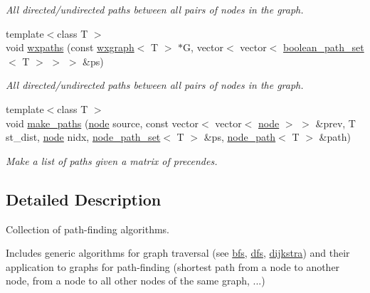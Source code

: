 \begin{DoxyCompactItemize}
\begin{DoxyCompactList}\small\item\em All directed/undirected paths between all pairs of nodes in the graph. \end{DoxyCompactList}\item 
{\footnotesize template$<$class T $>$ }\\void \hyperlink{namespacelgraph_1_1traversal_a8c0b0ebe4cbc4c84d4680727df88d307}{wxpaths} (const \hyperlink{classlgraph_1_1utils_1_1wxgraph}{wxgraph}$<$ T $>$ $\ast$G, vector$<$ vector$<$ \hyperlink{namespacelgraph_1_1utils_aaf50131e15d771a45620336d6e7a77f8}{boolean\+\_\+path\+\_\+set}$<$ T $>$ $>$ $>$ \&ps)
\begin{DoxyCompactList}\small\item\em All directed/undirected paths between all pairs of nodes in the graph. \end{DoxyCompactList}\item 
{\footnotesize template$<$class T $>$ }\\void \hyperlink{namespacelgraph_1_1traversal_a4e9d55395fdaa0ee831766decb20760b}{make\+\_\+paths} (\hyperlink{namespacelgraph_1_1utils_a7bd66ede3805ef121bc2835bd48de0cf}{node} source, const vector$<$ vector$<$ \hyperlink{namespacelgraph_1_1utils_a7bd66ede3805ef121bc2835bd48de0cf}{node} $>$ $>$ \&prev, T st\+\_\+dist, \hyperlink{namespacelgraph_1_1utils_a7bd66ede3805ef121bc2835bd48de0cf}{node} nidx, \hyperlink{namespacelgraph_1_1utils_a723c115f9865edfab11a90377b9abef4}{node\+\_\+path\+\_\+set}$<$ T $>$ \&ps, \hyperlink{classlgraph_1_1utils_1_1node__path}{node\+\_\+path}$<$ T $>$ \&path)\hypertarget{namespacelgraph_1_1traversal_a4e9d55395fdaa0ee831766decb20760b}{}\label{namespacelgraph_1_1traversal_a4e9d55395fdaa0ee831766decb20760b}

\begin{DoxyCompactList}\small\item\em Make a list of paths given a matrix of precendes. \end{DoxyCompactList}\end{DoxyCompactItemize}


\subsection{Detailed Description}
Collection of path-\/finding algorithms. 

Includes generic algorithms for graph traversal (see \hyperlink{namespacelgraph_1_1traversal_1_1bfs}{bfs}, \hyperlink{namespacelgraph_1_1traversal_1_1dfs}{dfs}, \hyperlink{namespacelgraph_1_1traversal_1_1dijkstra}{dijkstra}) and their application to graphs for path-\/finding (shortest path from a node to another node, from a node to all other nodes of the same graph, ...) 

